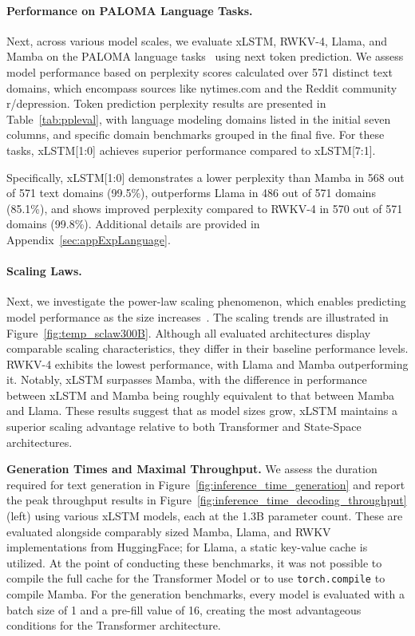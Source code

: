 \paragraph{Performance on PALOMA Language Tasks.} Next, across various model scales, we evaluate xLSTM, RWKV-4, Llama, and Mamba on the PALOMA language tasks~\citep{Magnusson:23arxivshort} using next token prediction. We assess model performance based on perplexity scores calculated over 571 distinct text domains, which encompass sources like nytimes.com and the Reddit community r/depression.
Token prediction perplexity results are presented in Table~\ref{tab:ppleval}, with language modeling domains listed in the initial seven columns, and specific domain benchmarks grouped in the final five. For these tasks, xLSTM[1:0] achieves superior performance compared to xLSTM[7:1].

Specifically, xLSTM[1:0] demonstrates a lower perplexity than Mamba in 568 out of 571 text domains (99.5\%), outperforms Llama in 486 out of 571 domains (85.1\%), and shows improved perplexity compared to RWKV-4 in 570 out of 571 domains (99.8\%). Additional details are provided in Appendix~\ref{sec:appExpLanguage}.

\paragraph{Scaling Laws.} Next, we investigate the power-law scaling phenomenon, which enables predicting model performance as the size increases~\citep{Kaplan:20,Brown:20short}. The scaling trends are illustrated in Figure~\ref{fig:temp_sclaw300B}. Although all evaluated architectures display comparable scaling characteristics, they differ in their baseline performance levels. RWKV-4 exhibits the lowest performance, with Llama and Mamba outperforming it. Notably, xLSTM surpasses Mamba, with the difference in performance between xLSTM and Mamba being roughly equivalent to that between Mamba and Llama. These results suggest that as model sizes grow, xLSTM maintains a superior scaling advantage relative to both Transformer and State-Space architectures.

\textbf{Generation Times and Maximal Throughput.} We assess the duration required for text generation in Figure~\ref{fig:inference_time_generation} and report the peak throughput results in Figure~\ref{fig:inference_time_decoding_throughput} (left) using various xLSTM models, each at the 1.3B parameter count. These are evaluated alongside comparably sized Mamba, Llama, and RWKV implementations from HuggingFace; for Llama, a static key-value cache is utilized. At the point of conducting these benchmarks, it was not possible to compile the full cache for the Transformer Model or to use \texttt{torch.compile} to compile Mamba. For the generation benchmarks, every model is evaluated with a batch size of 1 and a pre-fill value of 16, creating the most advantageous conditions for the Transformer architecture. 

